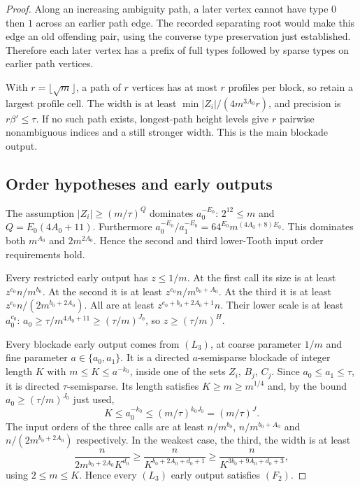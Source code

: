 \documentclass[11pt,a4paper]{article}
\theoremstyle{definition}
\theoremstyle{remark}
\numberwithin{equation}{section}
\begin{document}
\begin{proof}
Along an increasing ambiguity path, a later vertex cannot have type \(0\) then \(1\) across an earlier path edge. The recorded separating root would make this edge an old offending pair, using the converse type preservation just established. Therefore each later vertex has a prefix of full types followed by sparse types on earlier path vertices.

With \(r=\lfloor \sqrt{m}\rfloor\), a path of \(r\) vertices has at most \(r\) profiles per block, so retain a largest profile cell. The width is at least \(\min  |Z_{i}|/(4m^{3A_{0}}r)\), and precision is \(r \beta'\le\allowbreak \tau\). If no such path exists, longest-path height levels give \(r\) pairwise nonambiguous indices and a still stronger width. This is the main blockade output.
\subsection{Order hypotheses and early outputs}\label{subsec:rpq-checks}
The assumption \(|Z_{i}|\ge\allowbreak (m/\tau)^{Q}\) dominates \(a_{0}^{-E_{0}}\): \(2^{12}\le\allowbreak m\) and \(Q=E_{0}(4A_{0}+11)\). Furthermore \(a_{0}^{-E_{0}} / a_{1}^{-E_{0}} =64^{E_{0}} m^{(4A_{0}+8)E_{0}}\). This dominates both \(m^{A_{0}}\) and \(2m^{2A_{0}}\). Hence the second and third lower-Tooth input order requirements hold.

Every restricted early output has \(z\le\allowbreak 1/m\). At the first call its size is at least \(z^{e_{0}} n/m^{b_{0}}\). At the second it is at least \(z^{e_{0}} n/m^{b_{0}+A_{0}}\). At the third it is at least \(z^{e_{0}} n/(2m^{b_{0}+2A_{0}})\). All are at least \(z^{e_{0}+b_{0}+2A_{0}+1}n\). Their lower scale is at least \(a_{0}^{c_{0}}\): \(a_{0}\ge\allowbreak \tau/m^{4A_{0}+11}\ge\allowbreak (\tau/m)^{J_{0}}\), so \(z\ge\allowbreak (\tau/m)^{H}\).

Every blockade early output comes from \((L_{3})\), at coarse parameter \(1/m\) and fine parameter \(a\in\{a_{0},a_{1}\}\). It is a directed \(a\)-semisparse blockade of integer length \(K\) with \(m\le K\le a^{-k_{0}}\), inside one of the sets \(Z_{i}\), \(B_{j}\), \(C_{j}\). Since \(a_{0}\le a_{1}\le\tau\), it is directed \(\tau\)-semisparse. Its length satisfies \(K\ge m\ge m^{1/4}\) and, by the bound \(a_{0}\ge(\tau/m)^{J_{0}}\) just used,
\[
 K\le a_{0}^{-k_{0}}\le (m/\tau)^{k_{0}J_{0}}=(m/\tau)^{J}.
\]
The input orders of the three calls are at least \(n/m^{b_{0}}\), \(n/m^{b_{0}+A_{0}}\) and \(n/(2m^{b_{0}+2A_{0}})\) respectively. In the weakest case, the third, the width is at least
\begin{equation}\label{eq:rpq-early-width}
 \frac{n}{2m^{b_{0}+2A_{0}}K^{d_{0}}}
 \ge\frac{n}{K^{b_{0}+2A_{0}+d_{0}+1}}
 \ge\frac{n}{K^{3b_{0}+9A_{0}+d_{0}+3}},
\end{equation}
using \(2\le m\le K\). Hence every \((L_{3})\) early output satisfies \((F_{2})\).


\end{proof}
\end{document}
